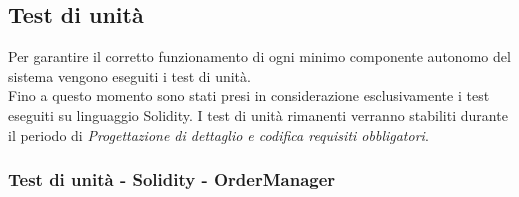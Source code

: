 \vspace{1cm}
\subsection{Test di unità}\label{subsection:test_unita}
Per garantire il corretto funzionamento di ogni minimo componente autonomo del sistema vengono eseguiti i test di unità. \\
Fino a questo momento sono stati presi in considerazione esclusivamente i test eseguiti su linguaggio Solidity\glo{}.
I test di unità rimanenti verranno stabiliti durante il periodo di \textit{Progettazione di dettaglio e codifica requisiti obbligatori}.

\subsubsection{Test di unità - Solidity - OrderManager}\label{subsubsection:TUO}
